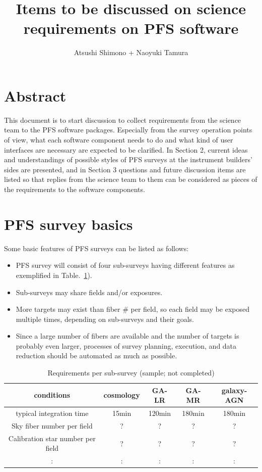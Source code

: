\documentclass[a4paper,notitlepage]{article}
\title{Items to be discussed on science requirements on PFS software}
\author{Atsushi Shimono + Naoyuki Tamura}
\begin{document}

\ssnhead

\section{Abstract}

This document is to start discussion to collect requirements from the
science team to the PFS software packages. Especially from the survey
operation points of view, what each software component needs to do and
what kind of user interfaces are necessary are expected to be
clarified. In Section 2, current ideas and understandings of possible
styles of PFS surveys at the instrument builders' sides are presented,
and in Section 3 questions and future discussion items are listed so
that replies from the science team to them can be considered as pieces
of the requirements to the software components.

\section{PFS survey basics}

Some basic features of PFS surveys can be listed as follows:
\begin{itemize}
 \item PFS survey will consist of four sub-surveys having different
       features as exemplified in
       Table.~\ref{tab:sciops-scireq-subsvy}).
 \item Sub-surveys may share fields and/or exposures.
 \item More targets may exist than fiber \# per field, so each field
       may be exposed multiple times, depending on sub-surveys and
       their goals.
 \item Since a large number of fibers are available and the number of
       targets is probably even larger, processes of survey planning,
       execution, and data reduction should be automated as much as
       possible.
\end{itemize}

\begin{table}[htb]
\caption{Requirements per sub-survey (sample; not completed)}
\label{tab:sciops-scireq-subsvy}
\begin{center}
\begin{tabular}{c|c|c|c|c}
conditions & cosmology & GA-LR & GA-MR & galaxy-AGN \\
\hline
\hline
typical integration time & 15min & 120min & 180min & 180min \\
\hline
Sky fiber number per field & ? & ? & ? & ? \\
\hline
Calibration star number per field & ? & ? & ? & ? \\
\hline
 : & : & : & : & : \\
\end{tabular}
\end{center}
\end{table}
\end{document}
